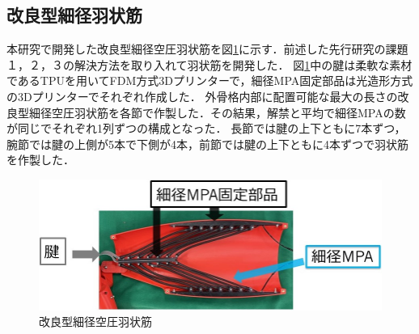 \subsection{改良型細径羽状筋}
本研究で開発した改良型細径空圧羽状筋を図\ref{fig:ujyoukin_new}に示す．前述した先行研究の課題１，２，３の解決方法を取り入れて羽状筋を開発した．
図\ref{fig:ujyoukin_new}中の腱は柔軟な素材であるTPUを用いてFDM方式3Dプリンターで，細径MPA固定部品は光造形方式の3Dプリンターでそれぞれ作成した．
外骨格内部に配置可能な最大の長さの改良型細径空圧羽状筋を各節で作製した．その結果，解禁と平均で細径MPAの数が同じでそれぞれ1列ずつの構成となった．
長節では腱の上下ともに7本ずつ，腕節では腱の上側が5本で下側が4本，前節では腱の上下ともに4本ずつで羽状筋を作製した．
%
\begin{figure}[ht]
  \centering
  \includegraphics[scale=0.7]{image/uyjoukin_new.jpg}
  \caption{改良型細径空圧羽状筋}
  \label{fig:ujyoukin_new}
\end{figure}
%
%
